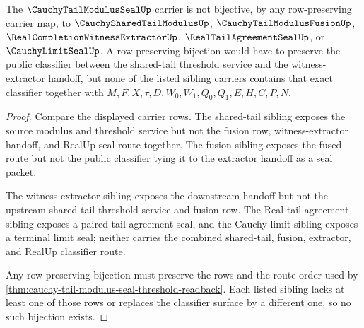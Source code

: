 \begin{theorem}
\label{thm:cauchy-tail-modulus-seal-independence-witness}
The $\CauchyTailModulusSealUp$ carrier is not bijective, by any row-preserving carrier map, to $\CauchySharedTailModulusUp$, $\CauchyTailModulusFusionUp$, $\RealCompletionWitnessExtractorUp$, $\RealTailAgreementSealUp$, or $\CauchyLimitSealUp$. A row-preserving bijection would have to preserve the public classifier between the shared-tail threshold service and the witness-extractor handoff, but none of the listed sibling carriers contains that exact classifier together with $M,F,X,\tau,D,W_0,W_1,Q_0,Q_1,E,H,C,P,N$.
\end{theorem}
\begin{proof}
Compare the displayed carrier rows. The shared-tail sibling exposes the source modulus and threshold service but not the fusion row, witness-extractor handoff, and RealUp seal route together. The fusion sibling exposes the fused route but not the public classifier tying it to the extractor handoff as a seal packet.

The witness-extractor sibling exposes the downstream handoff but not the upstream shared-tail threshold service and fusion row. The Real tail-agreement sibling exposes a paired tail-agreement seal, and the Cauchy-limit sibling exposes a terminal limit seal; neither carries the combined shared-tail, fusion, extractor, and RealUp classifier route.

Any row-preserving bijection must preserve the rows and the route order used by \autoref{thm:cauchy-tail-modulus-seal-threshold-readback}. Each listed sibling lacks at least one of those rows or replaces the classifier surface by a different one, so no such bijection exists.
\end{proof}

